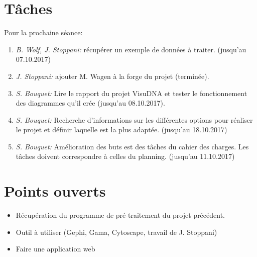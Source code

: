 \documentclass{article}
\newcommand{\hmwkAuthorName}{S. Bouquet} %
\begin{document}
\section{Tâches}
Pour la prochaine séance:
\begin{enumerate}
  \item \textit{B. Wolf, J. Stoppani:} récupérer un exemple de données à traiter. (jusqu'au 07.10.2017)
  \item \textit{J. Stoppani:} ajouter M. Wagen à la forge du projet (terminée).
  \item \textit{\hmwkAuthorName:} Lire le rapport du projet VisuDNA et tester le fonctionnement des diagrammes qu'il crée (jusqu'au 08.10.2017).
  \item \textit{\hmwkAuthorName:} Recherche d'informations sur les différentes options pour réaliser le projet et définir laquelle est la plus adaptée. (jusqu'au 18.10.2017)
  \item \textit{\hmwkAuthorName:} Amélioration des buts est des tâches du cahier des charges. Les tâches doivent correspondre à celles du planning. (jusqu'au 11.10.2017)
\end{enumerate}

\section{Points ouverts}
\begin{itemize}
  \item Récupération du programme de pré-traitement du projet précédent.
  \item Outil à utiliser (Gephi, Gama, Cytoscape, travail de J. Stoppani)
  \item Faire une application web
\end{itemize}


\begingroup
  \renewcommand{\section}[2]{}
  
  
  \nocite{*}
\endgroup
\end{document}
